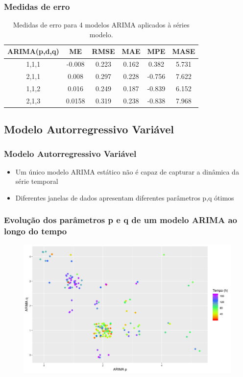 \documentclass[mathserif,serif]{beamer}
\begin{document}
\begin{frame}
	\frametitle{Medidas de erro}
	\begin{table}[h]
		\centering
		\begin{tabular}{ |c|c|c|c|c|c| } 
			\hline
			\textbf{ARIMA(p,d,q)}&\textbf{ME}&\textbf{RMSE}&\textbf{MAE}&\textbf{MPE}&\textbf{MASE}\\
			\hline
			1,1,1&-0.008&0.223&0.162&0.382&5.731 \\
			\hline
			2,1,1&0.008&0.297&0.228&-0.756&7.622 \\
			\hline
			1,1,2&0.016&0.249&0.187&-0.839&6.152 \\
			\hline
			2,1,3&0.0158&0.319&0.238&-0.838&7.968 \\
			\hline
		\end{tabular}
		\caption{Medidas de erro para 4 modelos ARIMA aplicados à séries modelo.}
	\end{table}
\end{frame}

\subsection{Modelo Autorregressivo Variável}

\begin{frame}
	\frametitle{Modelo Autorregressivo Variável}
	\begin{itemize}
		\item<1-> Um único modelo ARIMA estático não é capaz de capturar a dinâmica da série temporal
		\item<2-> Diferentes janelas de dados apresentam diferentes parâmetros p,q ótimos		
	\end{itemize}	
\end{frame}

\begin{frame}
	\frametitle{Evolução dos parâmetros p e q de um modelo ARIMA ao longo do tempo}
	\begin{figure}
		\centering
		\includegraphics[scale=0.45]{var_arima}
	\end{figure}
\end{frame}
\end{document}
